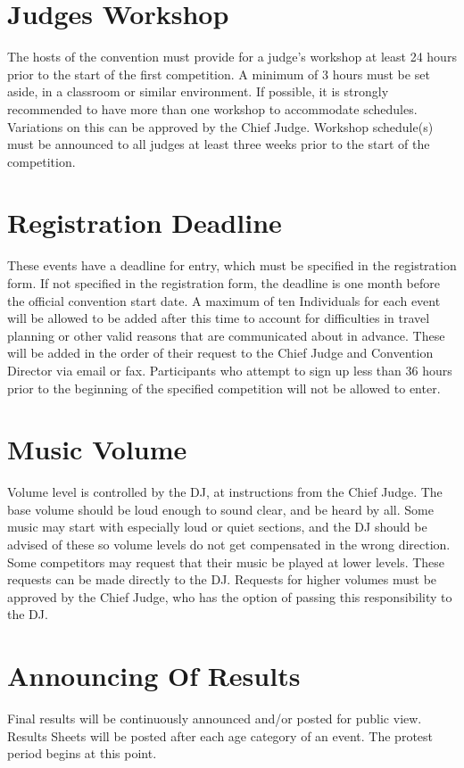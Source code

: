 \section{Judges Workshop}
The hosts of the convention must provide for a judge's workshop at least 24 hours prior to the start of the first competition.
A minimum of 3 hours must be set aside, in a classroom or similar environment.
If possible, it is strongly recommended to have more than one workshop to accommodate schedules.
Variations on this can be approved by the Chief Judge.
Workshop schedule(s) must be announced to all judges at least three weeks prior to the start of the competition.

\section{Registration Deadline}

These events have a deadline for entry, which must be specified in the registration form.
If not specified in the registration form, the deadline is one month before the official convention start date.
A maximum of ten Individuals for each event will be allowed to be added after this time to account for difficulties in travel planning or other valid reasons that are communicated about in advance.
These will be added in the order of their request to the Chief Judge and Convention Director via email or fax.
Participants who attempt to sign up less than 36 hours prior to the beginning of the specified competition will not be allowed to enter.

\section{Music Volume}
Volume level is controlled by the DJ, at instructions from the Chief Judge.
The base volume should be loud enough to sound clear, and be heard by all.
Some music may start with especially loud or quiet sections, and the DJ should be advised of these so volume levels do not get compensated in the wrong direction.
Some competitors may request that their music be played at lower levels.
These requests can be made directly to the DJ.
Requests for higher volumes must be approved by the Chief Judge, who has the option of passing this responsibility to the DJ.

\section{Announcing Of Results}
Final results will be continuously announced and/or posted for public view.
Results Sheets will be posted after each age category of an event.
The protest period begins at this point.
